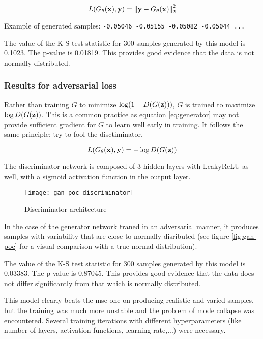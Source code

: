 \documentclass[../main.tex]{subfiles}
\begin{document}
\begin{equation}\label{eq:mse}
L(G_{\theta}(\mathbf{x}), \mathbf{y}) =
\left\| \mathbf{y} - G_{\theta}(\mathbf{x}) \right\|_2^2
\end{equation}

Example of generated samples:
\verb|-0.05046 -0.05155 -0.05082 -0.05044 ...|

The value of the K-S test statistic for 300 samples generated by this model is 0.1023.
The p-value is 0.01819. This provides good evidence that the data is not
normally distributed.

\subsubsection{Results for adversarial loss}
Rather than training $G$ to minimize $\log (1 - D(G(\mathbf{z})))$,
$G$ is trained to maximize $\log D(G(\mathbf{z}))$.
This is a common practice as equation
\eqref{eq:generator} may not provide sufficient gradient for $G$ to learn well
early in training. It follows the same principle: try to fool the disctiminator.

\begin{equation}
L(G_{\theta}(\mathbf{x}), \mathbf{y}) = - \log D(G(\mathbf{z}))
\end{equation}

The discriminator network is composed of 3 hidden layers with LeakyReLU as well,
with a sigmoid activation function in the output layer.

\begin{figure}[h]
\centering
\texttt{[image: gan-poc-discriminator]}
\caption{Discriminator architecture}
\label{fig:fig:gan-poc-generator}
\end{figure}

In the case of the generator network traned in an adversarial manner,
it produces samples with variability that are close to normally disributed
(see figure \ref{fig:gan-poc} for a visual comparison with a true normal
distribution).

The value of the K-S test statistic for 300 samples generated by this model is 0.03383.
The p-value is 0.87045. This provides good evidence that the data does
not differ significantly from that which is normally distributed.

This model clearly beats the \gls{mse} one on producing realistic and varied
samples, but the training was much more unstable and the problem of mode
collapse was encountered. Several training iterations with different
hyperparameters (like number of layers, activation functions, learning rate,...)
were necessary.
\end{document}
